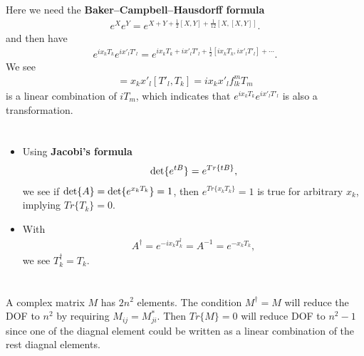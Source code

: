 \documentclass[11pt]{article}
\begin{document}
\section{ }
Here we need the {\bf Baker–Campbell–Hausdorff formula}
\begin{eqnarray}
    e^X e^Y = e^{X+Y+\frac{1}{2}[X,Y]+\frac{1}{12}[X,[X,Y]]}.
\end{eqnarray}
and then have
\begin{eqnarray}
    e^{ix_k T_k}e^{ix'_l T'_l}=e^{ix_k T_k+ix'_l T'_l+\frac{1}{2}[ix_k T_k,ix'_l T'_l]+\cdots}.
\end{eqnarray}
We see
\begin{eqnarray}
    [ix_k T_k,ix'_l T'_l]=x_k x'_l [ T'_l, T_k]=ix_k x'_l f_{lk}^mT_m
\end{eqnarray}
is a linear combination of $i T_m$, which indicates that  $e^{ix_k T_k}e^{ix'_l T'_l}$ is also a transformation.

\section{ }
\begin{itemize}
    \item Using {\bf Jacobi's formula}
    \begin{eqnarray}
        {\rm det}\{e^{tB}\}=e^{Tr\{tB\}},
    \end{eqnarray}
    we see if ${\rm det}\{A\}={\rm det}\{e^{x_kT_k}\}=1$, then $e^{Tr\{x_kT_k\}}=1$ is true for arbitrary $x_k$, implying $Tr\{T_k\}=0$.
    \item With
    \begin{eqnarray}
        A^\dagger = e^{-ix_kT_k^\dagger}= A^{-1}=e^{-x_kT_k},
    \end{eqnarray}
    we see $T^\dagger _k = T_k$.
\end{itemize}

\section{ }
A complex matrix $M$ has $2n^2$ elements. The condition $M^\dagger =M$ will reduce the DOF to $n^2$ by requiring $M_{ij}=M_{ji}^*$. Then $Tr\{M\}=0$ will reduce DOF to $n^2-1$ since one of the diagnal element could be written as a linear combination of the rest diagnal elements.
\end{document}

